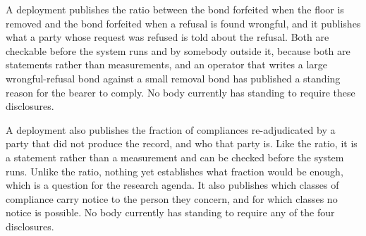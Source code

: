 
A deployment publishes the ratio between the bond forfeited when the floor is removed and the bond forfeited when a refusal is found wrongful, and it publishes what a party whose request was refused is told about the refusal. Both are checkable before the system runs and by somebody outside it, because both are statements rather than measurements, and an operator that writes a large wrongful-refusal bond against a small removal bond has published a standing reason for the bearer to comply. No body currently has standing to require these disclosures.

A deployment also publishes the fraction of compliances re-adjudicated by a party that did not produce the record, and who that party is. Like the ratio, it is a statement rather than a measurement and can be checked before the system runs. Unlike the ratio, nothing yet establishes what fraction would be enough, which is a
question for the research agenda. It also publishes which classes of compliance carry notice to the person they concern, and for which classes no notice is possible. No body currently has standing to require any of the four disclosures.
